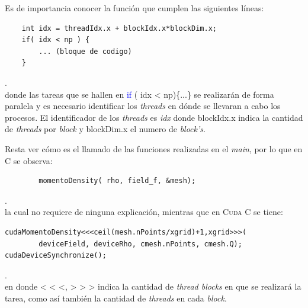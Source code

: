 Es de importancia conocer la función que cumplen las siguientes líneas:
{\footnotesize
	\begin{frame}{}
		\begin{lstlisting}
	int idx = threadIdx.x + blockIdx.x*blockDim.x;	
	if( idx < np ) {
		... (bloque de codigo)
	}	
		\end{lstlisting}
		
	\end{frame}
}.
\\
donde las tareas que se hallen en \textcolor{blue}{if} ( idx < np)\{...\} se realizarán de forma paralela y es necesario identificar los \textit{threads} en dónde se llevaran a cabo los procesos. El identificador de los \textit{threads} es \textit{idx} donde blockIdx.x  indica la cantidad de \textit{threads} por \textit{block} y blockDim.x el numero de \textit{block's}.

Resta ver cómo es el llamado de las funciones realizadas en el \textit{main}, por lo que en \textsc{C} se observa:
{\footnotesize
	\begin{frame}{}
		\begin{lstlisting}
		momentoDensity( rho, field_f, &mesh);
		\end{lstlisting}
		
	\end{frame}
}.
\\
la cual no requiere de ninguna explicación, mientras que en \textsc{Cuda C} se tiene:

{\footnotesize
	\begin{frame}{}
		\begin{lstlisting}
cudaMomentoDensity<<<ceil(mesh.nPoints/xgrid)+1,xgrid>>>(
 		deviceField, deviceRho, cmesh.nPoints, cmesh.Q);  
cudaDeviceSynchronize();

		\end{lstlisting}
		
	\end{frame}
}.
\\
en donde < < <, > > > indica la cantidad de \textit{thread blocks} en que se realizará la tarea, como así también la cantidad de \textit{threads} en cada \textit{block}.

